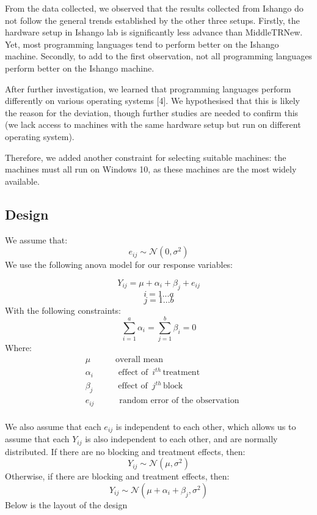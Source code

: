 \documentclass[12pt,halfline,a4paper,]{ouparticle}
\begin{document}
From the data collected, we observed that the results collected from
Ishango do not follow the general trends established by the other three
setups. Firstly, the hardware setup in Ishango lab is significantly less
advance than MiddleTRNew. Yet, most programming languages tend to
perform better on the Ishango machine. Secondly, to add to the first
observation, not all programming languages perform better on the Ishango
machine.

After further investigation, we learned that programming languages
perform differently on various operating systems {[}4{]}. We
hypothesised that this is likely the reason for the deviation, though
further studies are needed to confirm this (we lack access to machines
with the same hardware setup but run on different operating system).

Therefore, we added another constraint for selecting suitable machines:
the machines must all run on Windows 10, as these machines are the most
widely available.

\subsection{Design}\label{design}

We assume that: \[
e_{ij} \sim \mathcal{N}(0, \sigma^2)
\] We use the following anova model for our response variables:

\[
Y_{ij} = \mu + \alpha_i + \beta_j+ e_{ij}
\] \[
i = 1 ...a
\] \[
j = 1 ...b
\] With the following constraints: \[
\sum_{i=1}^a \alpha_i = \sum_{j=1}^b \beta_i =0 
\] Where: \[
\begin{aligned}
&\mu\hspace{35pt}  \text{overall mean} \\
&\alpha_i\hspace{35pt} \text{effect of }\, i^{th}\, \text{treatment}\\
&\beta_j\hspace{35pt} \text{effect of }\, j^{th}\, \text{block}\\
&e_{ij}\hspace{35pt} \text{random error of the observation}\\
\end{aligned}
\]

We also assume that each \(e_{ij}\) is independent to each other, which
allows us to assume that each \(Y_{ij}\) is also independent to each
other, and are normally distributed. If there are no blocking and
treatment effects, then: \[
Y_{ij} \sim \mathcal{N}(\mu, \sigma^2)
\] Otherwise, if there are blocking and treatment effects, then: \[
Y_{ij} \sim \mathcal{N}(\mu + \alpha_i + \beta_j, \sigma^2)
\] Below is the layout of the design
\end{document}

